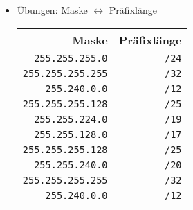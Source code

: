 \documentclass[a4paper,german]{scrartcl}
\begin{document}
\begin{itemize}
  \clearpage
  \item \"Ubungen: Maske $\leftrightarrow$ Pr\"afixl\"ange
      \begin{center}
        \begin{tabular}{rr}
          Maske & Pr\"afixl\"ange \\
          \hline
          \texttt{255.255.255.0} & \texttt{/24} \\
          \texttt{255.255.255.255}             & \texttt{/32} \\
          \texttt{255.240.0.0}   & \texttt{/12} \\
          \texttt{255.255.255.128}             & \texttt{/25} \\
          \texttt{255.255.224.0} & \texttt{/19} \\
          \texttt{255.255.128.0}             & \texttt{/17} \\
          \texttt{255.255.255.128} & \texttt{/25} \\
          \texttt{255.255.240.0}             & \texttt{/20} \\
          \texttt{255.255.255.255} & \texttt{/32} \\
          \texttt{255.240.0.0}             & \texttt{/12} \\
        \end{tabular}
      \end{center}



\end{itemize}
\end{document}
